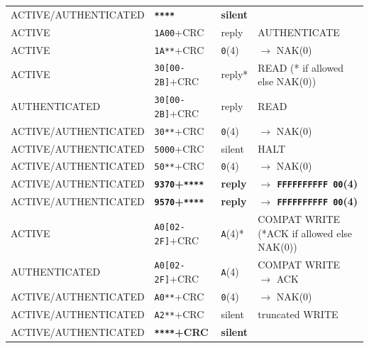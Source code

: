 \begin{longtable}{l l l l}
ACTIVE/AUTHENTICATED & \textbf{\texttt{****}}              & \textbf{silent} &                                             \\
ACTIVE               & \texttt{1A00}+CRC                   & reply           & AUTHENTICATE                                \\
ACTIVE               & \texttt{1A**}+CRC                   & \texttt{0}(4)            & $\rightarrow$ NAK(0)                        \\
ACTIVE               & \texttt{30[00-2B]}+CRC              & reply*          & READ (* if allowed else NAK(0))             \\
AUTHENTICATED        & \texttt{30[00-2B]}+CRC              & reply           & READ                                        \\
ACTIVE/AUTHENTICATED & \texttt{30**}+CRC                   & \texttt{0}(4)            & $\rightarrow$ NAK(0)                        \\
ACTIVE/AUTHENTICATED & \texttt{5000}+CRC                   & silent          & HALT                                        \\
ACTIVE/AUTHENTICATED & \texttt{50**}+CRC                   & \texttt{0}(4)            & $\rightarrow$ NAK(0)                        \\
ACTIVE/AUTHENTICATED          & \textbf{\texttt{9370}+\texttt{****}}          & \textbf{reply} & \textbf{$\rightarrow$ \texttt{FFFFFFFFFF 00}(4)}                \\
ACTIVE/AUTHENTICATED          & \textbf{\texttt{9570}+\texttt{****}}          & \textbf{reply} & \textbf{$\rightarrow$ \texttt{FFFFFFFFFF 00}(4)}       \\
ACTIVE               & \texttt{A0[02-2F]}+CRC          & \texttt{A}(4)*           & COMPAT WRITE (*ACK if allowed else NAK(0))  \\
AUTHENTICATED        & \texttt{A0[02-2F]}+CRC          & \texttt{A}(4)            & COMPAT WRITE $\rightarrow$ ACK              \\
ACTIVE/AUTHENTICATED & \texttt{A0**}+CRC                   & \texttt{0}(4)            & $\rightarrow$ NAK(0)                        \\
ACTIVE/AUTHENTICATED & \texttt{A2**}+CRC                   & silent          & truncated WRITE                             \\
ACTIVE/AUTHENTICATED & \textbf{\texttt{****}+CRC}          & \textbf{silent} &                                             \\

\end{longtable}
